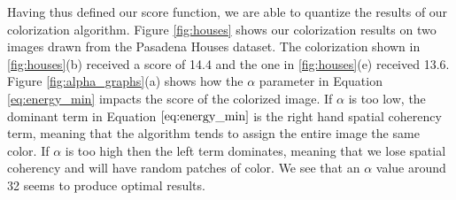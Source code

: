 Having thus defined our score function, we are able to quantize the results of our colorization algorithm.  Figure \ref{fig:houses} shows our colorization results on two images drawn from the Pasadena Houses dataset.  The colorization shown in \ref{fig:houses}(b) received a score of 14.4 and the one in \ref{fig:houses}(e) received 13.6.  Figure \ref{fig:alpha_graphs}(a) shows how the $\alpha$ parameter in Equation \ref{eq:energy_min} impacts the score of the colorized image.  If $\alpha$ is too low, the dominant term in Equation $\ref{eq:energy_min}$ is the right hand spatial coherency term, meaning that the algorithm tends to assign the entire image the same color.  If $\alpha$ is too high then the left term dominates, meaning that we lose spatial coherency and will have random patches of color.  We see that an $\alpha$ value around 32 seems to produce optimal results.
